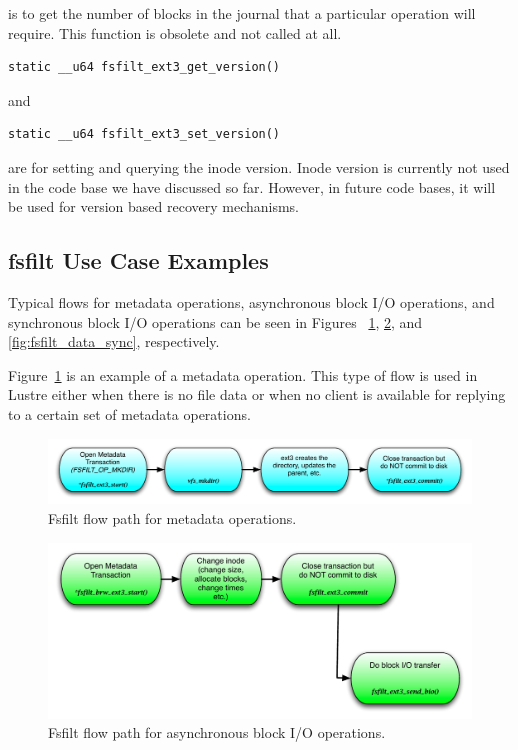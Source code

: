 is to get the number of blocks in the journal that a particular operation will
require. This function is obsolete and not called at all.

\begin{Verbatim}
static __u64 fsfilt_ext3_get_version()
\end{Verbatim}

and

\begin{Verbatim}
static __u64 fsfilt_ext3_set_version()
\end{Verbatim}

are for setting and querying the inode version. Inode version is currently not
used in the code base we have discussed so far. However, in future code bases,
it will be used for version based recovery mechanisms.

\subsection{fsfilt Use Case Examples}
\label{sec:fsfilt_examples}

Typical flows for metadata operations, asynchronous block I/O operations, and
synchronous block I/O operations can be seen in Figures
~\ref{fig:fsfilt_metadata}, \ref{fig:fsfilt_data_async}, and
\ref{fig:fsfilt_data_sync}, respectively.

Figure~\ref{fig:fsfilt_metadata} is an example of a metadata operation. This
type of flow is used in Lustre either when there is no file data or when no
client is available for replying to a certain set of metadata operations.

\begin{figure}[hbt]
\centering
\includegraphics[width=4.5in]{img/fsfilt_metadata}
\caption{Fsfilt flow path for metadata operations.}
\label{fig:fsfilt_metadata}
\end{figure}

\begin{figure}[hbt]
\centering
\includegraphics[width=5in]{img/fsfilt_data_async}
\caption{Fsfilt flow path for asynchronous block I/O operations.}
\label{fig:fsfilt_data_async}
\end{figure}

